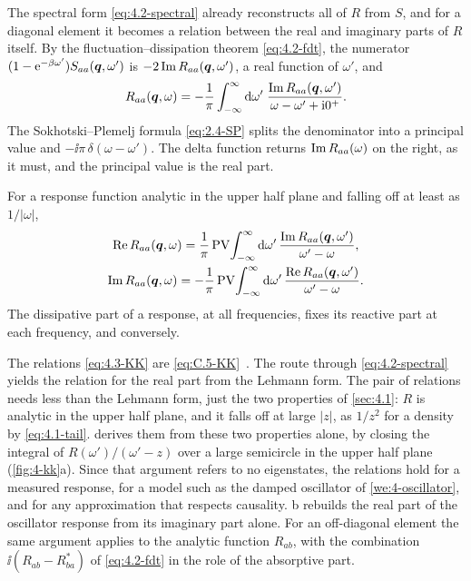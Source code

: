 The spectral form \cref{eq:4.2-spectral} already reconstructs all of $R$ from $S$, and for a diagonal element it becomes a relation between the real and imaginary parts of $R$ itself. By the fluctuation--dissipation theorem \cref{eq:4.2-fdt}, the numerator $(1 - \mathrm{e}^{-\beta\omega'})S_{aa}(\bm{q},\omega')$ is $-2\operatorname{Im} R_{aa}(\bm{q},\omega')$, a real function of $\omega'$, and
\begin{equation*}
  R_{aa}(\bm{q},\omega) = -\frac{1}{\pi}\int_{-\infty}^{\infty}\mathrm{d}\omega'\;\frac{\operatorname{Im} R_{aa}(\bm{q},\omega')}{\omega - \omega' + \mathrm{i}0^+} .
\end{equation*}
The Sokhotski--Plemelj formula \cref{eq:2.4-SP} splits the denominator into a principal value and $-\ii\pi\,\delta(\omega - \omega')$. The delta function returns $\operatorname{Im} R_{aa}(\omega)$ on the right, as it must, and the principal value is the real part.
\begin{keyresult}
For a response function analytic in the upper half plane and falling off at least as $1/|\omega|$,
\begin{equation}
  \begin{gathered}
  \operatorname{Re} R_{aa}(\bm{q},\omega) = \frac{1}{\pi}\operatorname{PV}\!\int_{-\infty}^{\infty}\mathrm{d}\omega'\,\frac{\operatorname{Im} R_{aa}(\bm{q},\omega')}{\omega' - \omega}, \\
  \operatorname{Im} R_{aa}(\bm{q},\omega) = -\frac{1}{\pi}\operatorname{PV}\!\int_{-\infty}^{\infty}\mathrm{d}\omega'\,\frac{\operatorname{Re} R_{aa}(\bm{q},\omega')}{\omega' - \omega} .
  \end{gathered}
  \label{eq:4.3-KK}
\end{equation}
The dissipative part of a response, at all frequencies, fixes its reactive part at each frequency, and conversely.
\end{keyresult}
The relations \cref{eq:4.3-KK} are \cref{eq:C.5-KK}~\cite{kronig1926theory,kramers1927diffusion}. The route through \cref{eq:4.2-spectral} yields the relation for the real part from the Lehmann form. The pair of relations needs less than the Lehmann form, just the two properties of \cref{sec:4.1}: $R$ is analytic in the upper half plane, and it falls off at large $|z|$, as $1/z^2$ for a density by \cref{eq:4.1-tail}.  derives them from these two properties alone, by closing the integral of $R(\omega')/(\omega' - z)$ over a large semicircle in the upper half plane (\cref{fig:4-kk}a). Since that argument refers to no eigenstates, the relations hold for a measured response, for a model such as the damped oscillator of \cref{we:4-oscillator}, and for any approximation that respects causality. b rebuilds the real part of the oscillator response from its imaginary part alone. For an off-diagonal element the same argument applies to the analytic function $R_{ab}$, with the combination $\ii(R_{ab} - R_{ba}^*)$ of \cref{eq:4.2-fdt} in the role of the absorptive part.


